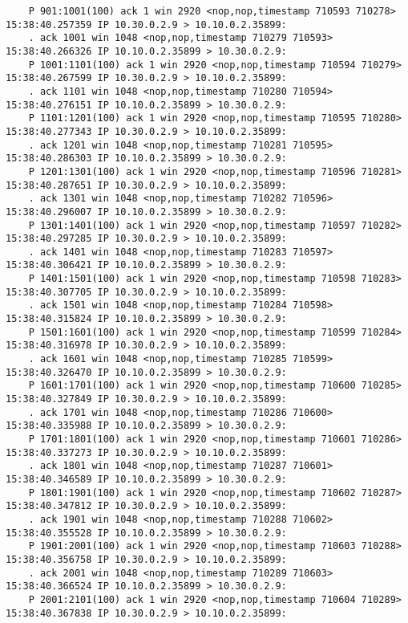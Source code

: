 \documentclass[a4paper,12pt]{article}
\begin{document}
\begin{Verbatim}
    P 901:1001(100) ack 1 win 2920 <nop,nop,timestamp 710593 710278>
15:38:40.257359 IP 10.30.0.2.9 > 10.10.0.2.35899: 
    . ack 1001 win 1048 <nop,nop,timestamp 710279 710593>
15:38:40.266326 IP 10.10.0.2.35899 > 10.30.0.2.9: 
    P 1001:1101(100) ack 1 win 2920 <nop,nop,timestamp 710594 710279>
15:38:40.267599 IP 10.30.0.2.9 > 10.10.0.2.35899: 
    . ack 1101 win 1048 <nop,nop,timestamp 710280 710594>
15:38:40.276151 IP 10.10.0.2.35899 > 10.30.0.2.9: 
    P 1101:1201(100) ack 1 win 2920 <nop,nop,timestamp 710595 710280>
15:38:40.277343 IP 10.30.0.2.9 > 10.10.0.2.35899: 
    . ack 1201 win 1048 <nop,nop,timestamp 710281 710595>
15:38:40.286303 IP 10.10.0.2.35899 > 10.30.0.2.9: 
    P 1201:1301(100) ack 1 win 2920 <nop,nop,timestamp 710596 710281>
15:38:40.287651 IP 10.30.0.2.9 > 10.10.0.2.35899: 
    . ack 1301 win 1048 <nop,nop,timestamp 710282 710596>
15:38:40.296007 IP 10.10.0.2.35899 > 10.30.0.2.9: 
    P 1301:1401(100) ack 1 win 2920 <nop,nop,timestamp 710597 710282>
15:38:40.297285 IP 10.30.0.2.9 > 10.10.0.2.35899: 
    . ack 1401 win 1048 <nop,nop,timestamp 710283 710597>
15:38:40.306421 IP 10.10.0.2.35899 > 10.30.0.2.9: 
    P 1401:1501(100) ack 1 win 2920 <nop,nop,timestamp 710598 710283>
15:38:40.307705 IP 10.30.0.2.9 > 10.10.0.2.35899: 
    . ack 1501 win 1048 <nop,nop,timestamp 710284 710598>
15:38:40.315824 IP 10.10.0.2.35899 > 10.30.0.2.9: 
    P 1501:1601(100) ack 1 win 2920 <nop,nop,timestamp 710599 710284>
15:38:40.316978 IP 10.30.0.2.9 > 10.10.0.2.35899: 
    . ack 1601 win 1048 <nop,nop,timestamp 710285 710599>
15:38:40.326470 IP 10.10.0.2.35899 > 10.30.0.2.9: 
    P 1601:1701(100) ack 1 win 2920 <nop,nop,timestamp 710600 710285>
15:38:40.327849 IP 10.30.0.2.9 > 10.10.0.2.35899: 
    . ack 1701 win 1048 <nop,nop,timestamp 710286 710600>
15:38:40.335988 IP 10.10.0.2.35899 > 10.30.0.2.9: 
    P 1701:1801(100) ack 1 win 2920 <nop,nop,timestamp 710601 710286>
15:38:40.337273 IP 10.30.0.2.9 > 10.10.0.2.35899: 
    . ack 1801 win 1048 <nop,nop,timestamp 710287 710601>
15:38:40.346589 IP 10.10.0.2.35899 > 10.30.0.2.9: 
    P 1801:1901(100) ack 1 win 2920 <nop,nop,timestamp 710602 710287>
15:38:40.347812 IP 10.30.0.2.9 > 10.10.0.2.35899: 
    . ack 1901 win 1048 <nop,nop,timestamp 710288 710602>
15:38:40.355528 IP 10.10.0.2.35899 > 10.30.0.2.9: 
    P 1901:2001(100) ack 1 win 2920 <nop,nop,timestamp 710603 710288>
15:38:40.356758 IP 10.30.0.2.9 > 10.10.0.2.35899: 
    . ack 2001 win 1048 <nop,nop,timestamp 710289 710603>
15:38:40.366524 IP 10.10.0.2.35899 > 10.30.0.2.9: 
    P 2001:2101(100) ack 1 win 2920 <nop,nop,timestamp 710604 710289>
15:38:40.367838 IP 10.30.0.2.9 > 10.10.0.2.35899: 

\end{Verbatim}
\end{document}
